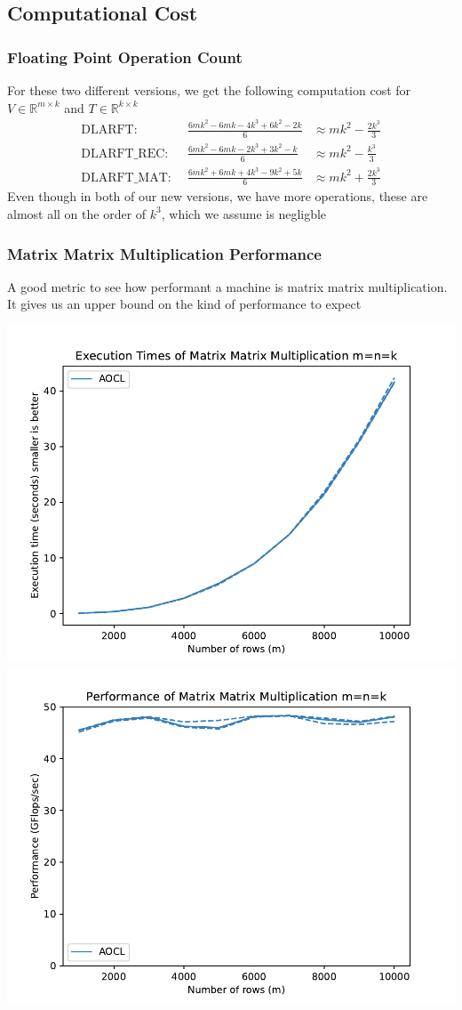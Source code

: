 \documentclass[12pt,aspectratio=169]{beamer}
\newcommand{\R}{\mathbb{R}}
\begin{document}
    \subsection{Computational Cost}
    \begin{frame}
        \frametitle{Floating Point Operation Count}
        For these two different versions, we get the following computation cost for $V\in\R^{m\times k}$ and  $T\in\R^{k\times k}$
        $$
        \begin{aligned}
            \text{DLARFT: }&\,      \frac{6mk^2 - 6mk -4k^3 +6k^2 - 2k}{6}&\approx mk^2 - \frac{2k^3}{3}\\
            \text{DLARFT\_REC: }&\, \frac{6mk^2 - 6mk -2k^3 +3k^2 -  k}{6}&\approx mk^2 - \frac{k^3}{3}\\
            \text{DLARFT\_MAT: }&\, \frac{6mk^2 + 6mk +4k^3 -9k^2 + 5k}{6}&\approx mk^2 + \frac{2k^3}{3}
        \end{aligned}
        $$
        Even though in both of our new versions, we have more operations, these are almost all on the order of $k^3$, 
        which we assume is negligble
    \end{frame}
    \begin{frame}
        \frametitle{Matrix Matrix Multiplication Performance}
        A good metric to see how performant a machine is matrix matrix multiplication. It gives us an upper bound on the kind of performance to expect
        \begin{centering}
            \includegraphics[width=.45\textwidth]{figures/timeMMM.pdf}
            \includegraphics[width=.45\textwidth]{figures/flopMMM.pdf}
        \end{centering}
    \end{frame}
\end{document}
